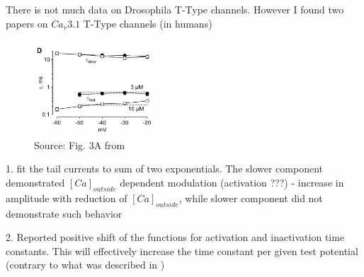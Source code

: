 \documentclass[11pt]{article}
\begin{document}
There is not much data on Drosophila T-Type channels. However I found two papers
on $Ca_v3.1$ T-Type channels (in humans)

\begin{figure}
    \vspace{-1.1\baselineskip}
    \includegraphics[width=0.4\textwidth]{img/2025_01_15/ca_modul_of_t_type_khan.png}
    \caption{Source: Fig. 3A from \parencite{gonzalo-gomezIhCurrentNecessary2012}}
\end{figure}
1. \parencite{khanPermeationGatingCaV312008} fit the tail currents to sum of
two exponentials. The slower component demonstrated $[Ca]_{outside}$ dependent
modulation (activation ???) - increase in amplitude with reduction of $[Ca]_{outside}$, while slower
component did not demonstrate such behavior

2. \parencite{talaveraExtracellularCa2Modulates2003} Reported positive
shift of the functions for activation and inactivation time constants. This will
effectively increase the time constant per given test potential (contrary to what
was described in \parencite{khanPermeationGatingCaV312008})

\vspace{1.3cm}
\end{document}
